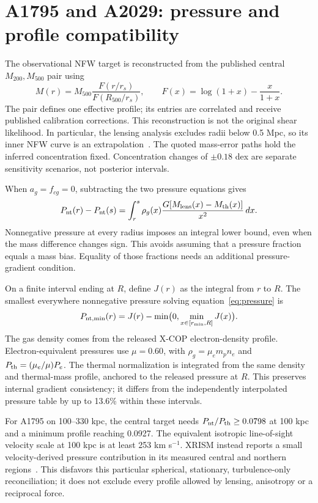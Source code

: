 \documentclass[11pt]{article}
\begin{document}
\clearpage
\section{A1795 and A2029: pressure and profile compatibility}
The observational NFW target is reconstructed from the published central $M_{200},M_{500}$ pair using
\[
M(r)=M_{500}\frac{F(r/r_s)}{F(R_{500}/r_s)},\qquad
F(x)=\log(1+x)-\frac{x}{1+x}.
\]
The pair defines one effective profile; its entries are correlated and receive published calibration corrections. This reconstruction is not the original shear likelihood. In particular, the lensing analysis excludes radii below 0.5 Mpc, so its inner NFW curve is an extrapolation~\cite{herbonnet}. The quoted mass-error paths hold the inferred concentration fixed. Concentration changes of $\pm0.18$ dex are separate sensitivity scenarios, not posterior intervals.

When $a_g=f_{cg}=0$, subtracting the two pressure equations gives
\begin{equation}
P_{\rm nt}(r)-P_{\rm nt}(s)=
\int_r^s \rho_g(x)\frac{G[M_{\rm lens}(x)-M_{\rm th}(x)]}{x^2}\,dx.
\label{eq:pressure}
\end{equation}
Nonnegative pressure at every radius imposes an integral lower bound, even when the mass difference changes sign. This avoids assuming that a pressure fraction equals a mass bias. Equality of those fractions needs an additional pressure-gradient condition.

On a finite interval ending at $R$, define $J(r)$ as the integral from $r$ to $R$. The smallest everywhere nonnegative pressure solving equation~\eqref{eq:pressure} is
\[
P_{\rm nt,min}(r)=J(r)-\min\bigl(0,\min_{x\in[r_{\min},R]}J(x)\bigr).
\]
The gas density comes from the released X-COP electron-density profile. Electron-equivalent pressures use $\mu=0.60$, with $\rho_g=\mu_e m_p n_e$ and $P_{\rm th}=(\mu_e/\mu)P_e$. The thermal normalization is integrated from the same density and thermal-mass profile, anchored to the released pressure at $R$. This preserves internal gradient consistency; it differs from the independently interpolated pressure table by up to 13.6\% within these intervals.

For A1795 on 100--330 kpc, the central target needs $P_{\rm nt}/P_{\rm th}\geq0.0798$ at 100 kpc and a minimum profile reaching 0.0927. The equivalent isotropic line-of-sight velocity scale at 100 kpc is at least 253 km s$^{-1}$. XRISM instead reports a small velocity-derived pressure contribution in its measured central and northern regions~\cite{sarkar}. This disfavors this particular spherical, stationary, turbulence-only reconciliation; it does not exclude every profile allowed by lensing, anisotropy or a reciprocal force.
\end{document}
